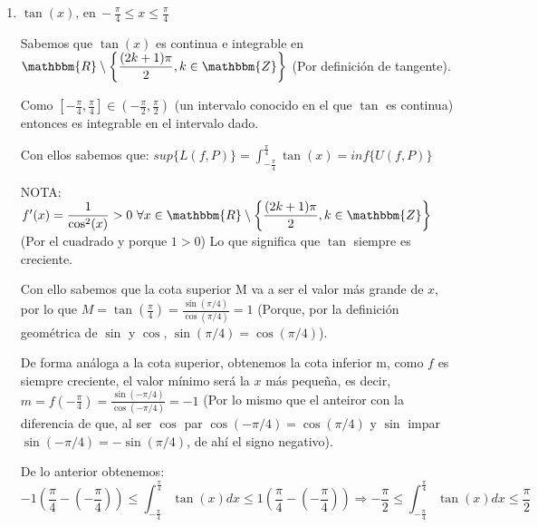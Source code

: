 \documentclass[12pt]{article}
\begin{document}
\begin{enumerate}[\hspace{9px} a)]
        Buscamos la cota superior M: Dado que la funci\'on es par y creciente en $x>0$, M tiene que ser el valor m\'as grande (m\'as a la derecha del 0) de $x$, que en en intervalo \([-4,4]\) es 4, as\'i entonces \(M = f(4) = 4^4 = 256\).

        Ahora para la cota inferior m: Sabemos que el valor mínimo que puede obtener la función es $f(0)=0$ y como \(0\in[-4,4]\) entoces $m=0$.\bigskip

        De lo anterior, se sigue que:
        \[0(4-(-4)) \leq \int_{-4}^{4}x^4dx \leq 256(4-(-4)) \Rightarrow 0\leq \int_{-4}^{4}x^4dx \leq 256(8)\]

    \item \(\tan(x) \text{, en} \ -\displaystyle\frac{\pi}{4} \leq x \leq \frac{\pi}{4}\) \bigskip

        Sabemos que $\tan(x)$ es continua e integrable en \(\mathbbm{R}\setminus\displaystyle\left\{\frac{(2k+1)\pi}{2}, k\in\mathbbm{Z}\right\}\) (Por definici\'on de tangente).\bigskip
        
        Como \(\left[-\displaystyle\frac{\pi}{4},\frac{\pi}{4}\right]\in\left(-\displaystyle\frac{\pi}{2},\frac{\pi}{2}\right)\) (un intervalo conocido en el que $\tan$ es continua) entonces es integrable en el intervalo dado.\bigskip
        
        Con ellos sabemos que: \quad \(sup\{L(f,P)\}=\displaystyle\int_{-\frac{\pi}{4}}^{\frac{\pi}{4}}\tan(x)=inf\{U(f,P)\}\)\bigskip

        NOTA: \(f'(x) = \displaystyle\frac{1}{\cos^2(x)} > 0 \ \forall x \in \mathbbm{R}\setminus\displaystyle\left\{\frac{(2k+1)\pi}{2}, k\in\mathbbm{Z}\right\}\) (Por el cuadrado y porque $1>0$) Lo que significa que $\tan$ siempre es creciente.\bigskip

        Con ello sabemos que la cota superior M va a ser el valor m\'as grande de $x$, por lo que \(M = \tan\left(\displaystyle\frac{\pi}{4}\right)=\displaystyle\frac{\sin(\pi/4)}{\cos(\pi/4)}=1\) (Porque, por la definici\'on geom\'etrica de $\sin$ y $\cos$, \(\sin(\pi/4)=\cos(\pi/4)\)).\bigskip

        De forma an\'aloga a la cota superior, obtenemos la cota inferior m, como $f$ es siempre creciente, el valor m\'inimo ser\'a la $x$ m\'as pequeña, es decir, \(m = f\left(-\displaystyle\frac{\pi}{4}\right) = \displaystyle\frac{\sin(-\pi/4)}{\cos(-\pi/4)}=-1\) (Por lo mismo que el anteiror con la diferencia de que, al ser $\cos$ par \(\cos(-\pi/4)=\cos(\pi/4)\) y $\sin$ impar \(\sin(-\pi/4)=-\sin(\pi/4)\), de ah\'i el signo negativo).\bigskip

        De lo anterior obtenemos:
        \[-1\left(\frac{\pi}{4}-\left(-\frac{\pi}{4}\right)\right) \leq \int_{-\frac{\pi}{4}}^{\frac{\pi}{4}}\tan(x)dx \leq 1\left(\frac{\pi}{4}-\left(-\frac{\pi}{4}\right)\right) \Rightarrow -\frac{\pi}{2} \leq \int_{-\frac{\pi}{4}}^{\frac{\pi}{4}}\tan(x)dx \leq \frac{\pi}{2}\]

\end{enumerate}
\end{document}
